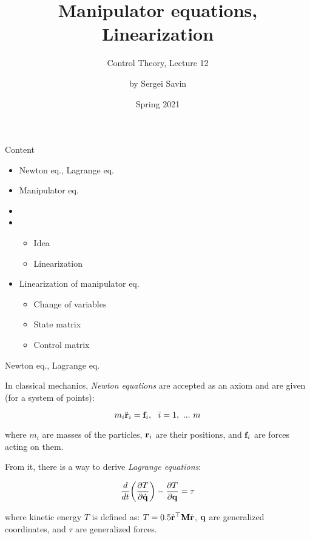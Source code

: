 \documentclass{beamer}
\title{Manipulator equations, Linearization}
\subtitle{Control Theory, Lecture 12}
\author{by Sergei Savin}
\date{Spring 2021}
\begin{document}
\maketitle


\begin{frame}{Content}
\begin{itemize}
\item Newton eq., Lagrange eq.
\item Manipulator eq.
\item \item 
\begin{itemize}
    \item Idea
    \item Linearization
\end{itemize}
\item Linearization of manipulator eq.
\begin{itemize}
    \item Change of variables
    \item State matrix
    \item Control matrix
\end{itemize}
\end{itemize}
\end{frame}


\begin{frame}{Newton eq., Lagrange eq.}
\begin{flushleft}

In classical mechanics, \emph{Newton equations} are accepted as an axiom and are given (for a system of points):

\begin{equation}
\label{eq:Newton}
    m_i\ddot{\mathbf{r}}_i = \mathbf{f}_i, \ \ i = 1, \ ... \ m  
\end{equation}

where $m_i$ are masses of the particles, $\mathbf{r}_i$ are their positions, and $\mathbf{f}_i$ are forces acting on them.

\bigskip

From it, there is a way to derive \emph{Lagrange equations}:

\begin{equation}
\label{eq:Lagrange}
    \frac{d}{dt} \bigg( 
    \frac{\partial T }{\partial \dot{\mathbf{q}}}
    \bigg) - 
    \frac{\partial T }{\partial \mathbf{q}} = \tau
\end{equation}

where kinetic energy $T$ is defined as: $T = 0.5 \dot{\mathbf{r}} ^\top \mathbf{M} \dot{\mathbf{r}}$, $\mathbf{q}$ are generalized coordinates, and $\tau$ are generalized forces.

\end{flushleft}
\end{frame}
\end{document}
